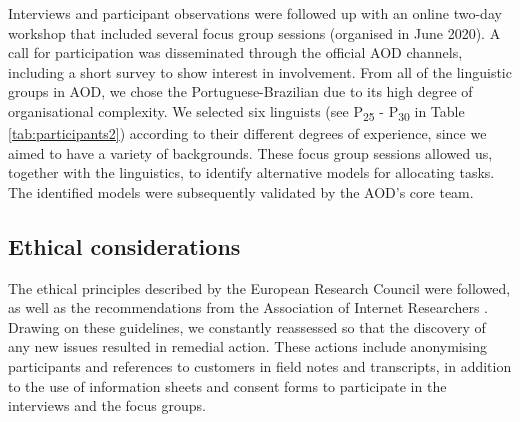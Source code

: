 Interviews and participant observations were followed up with an online two-day workshop that included several focus group sessions (organised in June 2020). A call for participation was disseminated through the official AOD channels, including a short survey to show interest in involvement. From all of the linguistic groups in AOD, we chose the Portuguese-Brazilian due to its high degree of organisational complexity. We selected six linguists (see P\textsubscript{25} - P\textsubscript{30} in Table \ref{tab:participants2}) according to their different degrees of experience, since we aimed to have a variety of backgrounds. These focus group sessions allowed us, together with the linguistics, to identify alternative models for allocating tasks. The identified models were subsequently validated by the AOD's core team.

\subsection{Ethical considerations}

The ethical principles described by the European Research Council \cite{erc_ethics} were followed, as well as the recommendations from the Association of Internet Researchers \cite{markham2012}. Drawing on these guidelines, we constantly reassessed so that the discovery of any new issues resulted in remedial action. These actions include anonymising participants and references to customers in field notes and transcripts, in addition to the use of information sheets and consent forms to participate in the interviews and the focus groups.